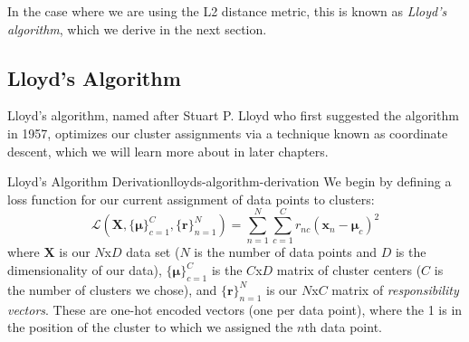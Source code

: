 In the case where we are using the L2 distance metric, this is known as \textit{Lloyd's algorithm}, which we derive in the next section.

\subsection{Lloyd's Algorithm}
Lloyd's algorithm, named after Stuart P. Lloyd who first suggested the algorithm in 1957, optimizes our cluster assignments via a technique known as coordinate descent, which we will learn more about in later chapters.

\begin{derivation}{Lloyd's Algorithm Derivation}{lloyds-algorithm-derivation}
	We begin by defining a loss function for our current assignment of data points to clusters:
	\begin{equation} \label{clustering-loss-fn}
		\mathcal{L}(\textbf{X}, \big\{\boldsymbol{\mu}\big\}_{c=1}^{C}, \big\{\textbf{r}\big\}_{n=1}^{N}) = \sum_{n=1}^{N} \sum_{c=1}^{C} r_{nc} (\textbf{x}_{n} - \boldsymbol{\mu}_{c})^{2}
	\end{equation}
	where $\textbf{X}$ is our $N$x$D$ data set ($N$ is the number of data points and $D$ is the dimensionality of our data), $\big\{\boldsymbol{\mu}\big\}_{c=1}^{C}$ is the $C$x$D$ matrix of cluster centers ($C$ is the number of clusters we chose), and $\big\{\textbf{r}\big\}_{n=1}^{N}$ is our $N$x$C$ matrix of \textit{responsibility vectors}. These are one-hot encoded vectors (one per data point), where the 1 is in the position of the cluster to which we assigned the $n$th data point. \newline


\end{derivation}
